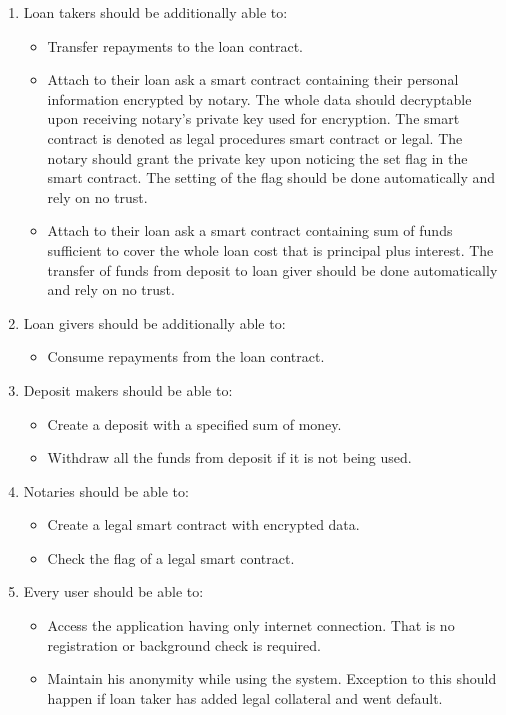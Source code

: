 \documentclass[a4paper,12pt,twoside,openany]{report}
\begin{document}
\begin{enumerate}
\item Loan takers should be additionally able to:
\begin{itemize}
\item Transfer repayments to the loan contract.
\item Attach to their loan ask a smart contract containing their personal information encrypted by notary. The whole data should decryptable upon receiving notary's private key used for encryption. The smart contract is denoted as legal procedures smart contract or legal. The notary should grant the private key upon noticing the set flag in the smart contract. The setting of the flag should be done automatically and rely on no trust.
\item Attach to their loan ask a smart contract containing sum of funds sufficient to cover the whole loan cost that is principal plus interest. The transfer of funds from deposit to loan giver should be done automatically and rely on no trust.
\end{itemize}

\item Loan givers should be additionally able to:
\begin{itemize}
\item Consume repayments from the loan contract.
\end{itemize}

\item Deposit makers should be able to:
\begin{itemize}
\item Create a deposit with a specified sum of money.
\item Withdraw all the funds from deposit if it is not being used.
\end{itemize}

\item Notaries should be able to:
\begin{itemize}
\item Create a legal smart contract with encrypted data.
\item Check the flag of a legal smart contract.
\end{itemize}

\item Every user should be able to:
\begin{itemize}
\item Access the application having only internet connection. That is no registration or background check is required.
\item Maintain his anonymity while using the system. Exception to this should happen if loan taker has added legal collateral and went default.
\end{itemize}
\end{enumerate}
\end{document}
